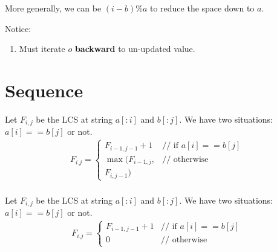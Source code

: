 More generally, we can be $(i-b)\%a$ to reduce the space down to $a$.

Notice:
\begin{enumerate}
\item Must iterate $o$ \textbf{backward} to un-updated value. 
\end{enumerate}



\section{Sequence}
 Let $F_{i, j}$ be the LCS at string $a[:i]$ and $b[:j]$. We have two situations: $a[i]==b[j]$ or not.
\begin{eqnarray*}
F_{i. j} = \left\{ \begin{array}{rl}
  F_{i-1, j-1}+1 &\mbox{// if $a[i]==b[j]$} \\
  \max\Big(F_{i-1, j},&\mbox{// otherwise} \\
  F_{i,j-1}\Big)
       \end{array} \right.
\end{eqnarray*}
\\
 Let $F_{i, j}$ be the LCS at string $a[:i]$ and
$b[:j]$. We have two situations: $a[i]==b[j]$ or not.
\begin{eqnarray*}
F_{i. j} = \left\{ \begin{array}{rl}
  F_{i-1, j-1}+1 &\mbox{// if $a[i]==b[j]$} \\
  0 &\mbox{// otherwise}
       \end{array} \right.
\end{eqnarray*}

